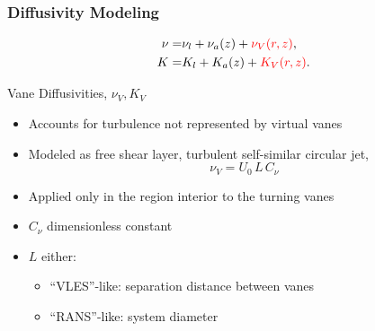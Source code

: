 \documentclass[mathserif]{beamer}
\begin{document}
%
%
%
\begin{frame}
  \frametitle{Diffusivity Modeling}
  
  \begin{eqnarray*}
    \nu =& \nu_{l} + \nu_{a}(z) + \textcolor{red}{\nu_{V}(r,z)}, \\
    K =& K_{l} + K_{a}(z) + \textcolor{red}{K_{V}(r,z)}.
  \end{eqnarray*}
  
  \begin{block}{Vane Diffusivities, $\nu_{V},K_{V}$ }
    \begin{itemize}
    \item Accounts for turbulence not represented by virtual vanes
    \item Modeled as free shear layer, turbulent self-similar circular jet,
      \begin{equation}
        \nu_V = U_0 \, L \, C_{\nu}
      \end{equation}
    \item Applied only in the region interior to the turning vanes
     \item $C_{\nu}$ dimensionless constant
    \item $L$ either: 
\begin{itemize}
 \item ``VLES''-like: separation distance between vanes 
 \item ``RANS''-like: system diameter
\end{itemize}


    \end{itemize}
  \end{block}
  
\end{frame}
\end{document}

